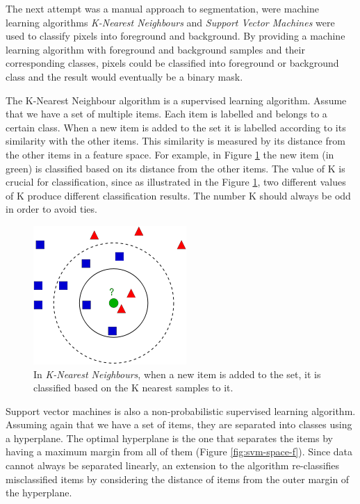 The next attempt was a manual approach to segmentation, were machine learning algorithms \textit{K-Nearest Neighbours} and \textit{Support Vector Machines} were used to classify pixels into foreground and background.
By providing a machine learning algorithm with foreground and background samples and their corresponding classes, pixels could be classified into foreground or background class and the result would eventually be a binary mask.
\par
The K-Nearest Neighbour algorithm is a supervised learning algorithm. Assume that we have a set of multiple items. Each item is labelled and belongs to a certain class. When a new item is added to the set it is labelled according to its similarity with the other items. This similarity is measured by its distance from the other items in a feature space. For example, in Figure \ref{fig:knn-space-f} the new item (in green) is classified based on its distance from the other items. The value of K is crucial for classification, since as illustrated in the Figure \ref{fig:knn-space-f}, two different values of K produce different classification results. The number K should always be odd in order to avoid ties.

\begin{figure}[t]
\centering
\includegraphics[width=0.5\columnwidth]{Chapter4/4/knn.png}
\caption[KNN 2-D sample space visualization.]{In \textit{K-Nearest Neighbours}, when a new item is added to the set, it is classified based on the K nearest samples to it.}
\label{fig:knn-space-f}
\end{figure}

Support vector machines is also a non-probabilistic supervised learning algorithm. Assuming again that we have a set of items, they are separated into classes using a hyperplane. The optimal hyperplane is the one that separates the items by having a maximum margin from all of them (Figure \ref{fig:svm-space-f}). Since data cannot always be separated linearly, an extension to the algorithm re-classifies misclassified items by considering the distance of items from the outer margin of the hyperplane.

